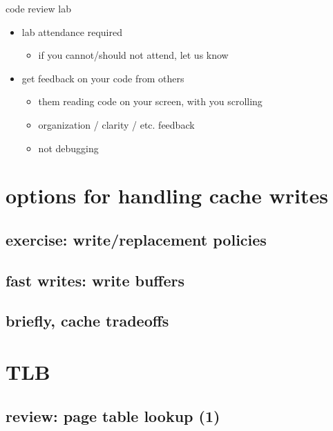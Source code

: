 \begin{frame}{code review lab}
    \begin{itemize}
    \item lab attendance required
        \begin{itemize}
        \item if you cannot/should not attend, let us know
        \end{itemize}
    \item get feedback on your code from others
        \begin{itemize}
        \item them reading code on your screen, with you scrolling
        \item organization / clarity / etc. feedback
        \item not debugging
        \end{itemize}
    \end{itemize}
\end{frame}

\section{options for handling cache writes}


\subsection{exercise: write/replacement policies}


\subsection{fast writes: write buffers}


\subsection{briefly, cache tradeoffs}


\section{TLB}

\subsection{review: page table lookup (1)}


